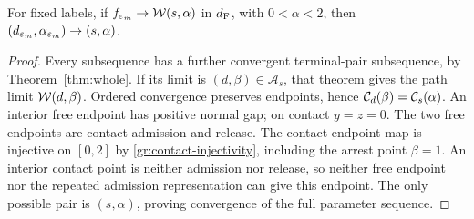 \begin{lemma}
\label{sel:path-identification}
For fixed labels, if $f_{\varepsilon_m}\to\mathcal W(s,\alpha)$ in $d_{\mathrm F}$, with
$0<\alpha<2$, then
$(d_{\varepsilon_m},\alpha_{\varepsilon_m})\to(s,\alpha)$.
\end{lemma}
\begin{proof}
Every subsequence has a further convergent terminal-pair subsequence,
by Theorem~\ref{thm:whole}. If its limit is $(d,\beta)\in\mathcal A_s$,
that theorem gives the path limit $\mathcal W(d,\beta)$.
Ordered convergence preserves endpoints, hence
$\mathcal C_d(\beta)=\mathcal C_s(\alpha)$.
An interior free endpoint has positive normal gap; on contact
$y=z=0$. The two free endpoints are contact admission and release.
The contact endpoint map is injective on $[0,2]$ by
\eqref{gr:contact-injectivity}, including the arrest point $\beta=1$.
An interior contact point is neither admission nor release, so neither
free endpoint nor the repeated admission representation can give this
endpoint. The only possible pair is $(s,\alpha)$, proving convergence
of the full parameter sequence.
\end{proof}

